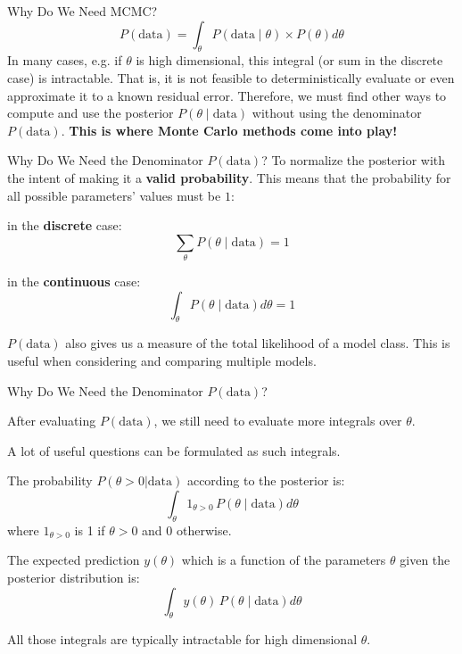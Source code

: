 \begin{frame}{Why Do We Need MCMC?}
	$$
		P(\text{data})=\int_{\theta} P(\text{data} \mid \theta) \times P(\theta)d \theta
	$$
	In many cases, e.g. if $\theta$ is high dimensional, this integral (or sum in the discrete case) is intractable.
	That is, it is not feasible to deterministically evaluate or even approximate it to a known residual error.
	Therefore, we must find other ways to compute and use the posterior
	$P(\theta \mid \text{data})$ without using the denominator
	$P(\text{data})$.
	\vfill
	\Large \textbf{This is where Monte Carlo methods come into play!}
\end{frame}

\begin{frame}{Why Do We Need the Denominator $P(\text{data})$?}
	To normalize the posterior with the intent of making it a \textbf{valid probability}.
	This means that the probability for all possible parameters' values must be $1$:
	\begin{vfilleditems}
		\item in the \textbf{discrete} case:
		$$
			\sum_{\theta} P(\theta \mid \text{data}) = 1
		$$
		\item in the \textbf{continuous} case:
		$$
			\int_{\theta} P(\theta \mid \text{data})d \theta = 1
		$$
	\end{vfilleditems}
	$P(\text{data})$ also gives us a measure of the total likelihood of a model class. This is useful when considering and comparing multiple models.
\end{frame}

\begin{frame}{Why Do We Need the Denominator $P(\text{data})$?}
	\begin{vfilleditems}
		\item After evaluating $P(\text{data})$, we still need to evaluate more integrals over $\theta$.
		\item A lot of useful questions can be formulated as such integrals.
		\item The probability $P(\theta > 0 | \text{data})$ according to the posterior is:
		$$
			\int_{\theta} 1_{\theta > 0} \, P(\theta \mid \text{data}) d\theta
		$$
		where $1_{\theta > 0}$ is 1 if $\theta > 0$ and 0 otherwise.
		\item The expected prediction $y(\theta)$ which is a function of the parameters $\theta$ given the posterior distribution is:
		$$
			\int_{\theta} y(\theta) \, P(\theta \mid \text{data}) d\theta
		$$
		\item All those integrals are typically intractable for high dimensional $\theta$.
	\end{vfilleditems}
\end{frame}

